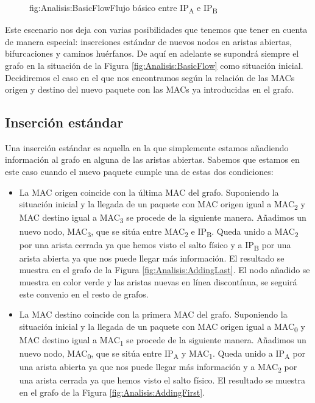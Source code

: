 \documentclass[tfg,epsbased,lof,lot,loa,covers,final,copyright,overleaf]{tfgtfmthesisuam}
\begin{document}
\begin{figure}[Flujo básico entre dos IPs]{fig:Analisis:BasicFlow}{Flujo básico entre IP\textsubscript{A} e IP\textsubscript{B}}
    
\end{figure}

Este escenario nos deja con varias posibilidades que tenemos que tener en cuenta de manera especial: inserciones estándar de nuevos nodos en aristas abiertas, bifurcaciones y caminos huérfanos. De aquí en adelante se supondrá siempre el grafo en la situación de la Figura \ref{fig:Analisis:BasicFlow} como situación inicial. Decidiremos el caso en el que nos encontramos según la relación de las MACs origen y destino del nuevo paquete con las MACs ya introducidas en el grafo.

\subsection{Inserción estándar}
Una inserción estándar es aquella en la que simplemente estamos añadiendo información al grafo en alguna de las aristas abiertas. Sabemos que estamos en este caso cuando el nuevo paquete cumple una de estas dos condiciones:
\begin{itemize}
    \item La MAC origen coincide con la última MAC del grafo. Suponiendo la situación inicial y la llegada de un paquete con MAC origen igual a MAC\textsubscript{2} y MAC destino igual a MAC\textsubscript{3} se procede de la siguiente manera. Añadimos un nuevo nodo, MAC\textsubscript{3}, que se sitúa entre MAC\textsubscript{2} e IP\textsubscript{B}. Queda unido a  MAC\textsubscript{2} por una arista cerrada ya que hemos visto el salto físico y a IP\textsubscript{B} por una arista abierta ya que nos puede llegar más información. El resultado se muestra en el grafo de la Figura \ref{fig:Analisis:AddingLast}. El nodo añadido se muestra en color verde y las aristas nuevas en línea discontínua, se seguirá este convenio en el resto de grafos.
    \item La MAC destino coincide con la primera MAC del grafo. Suponiendo la situación inicial y la llegada de un paquete con MAC origen igual a MAC\textsubscript{0} y MAC destino igual a MAC\textsubscript{1} se procede de la siguiente manera. Añadimos un nuevo nodo, MAC\textsubscript{0}, que se sitúa entre IP\textsubscript{A} y MAC\textsubscript{1}. Queda unido a IP\textsubscript{A} por una arista abierta ya que nos puede llegar más información y a  MAC\textsubscript{2} por una arista cerrada ya que hemos visto el salto físico. El resultado se muestra en el grafo de la Figura \ref{fig:Analisis:AddingFirst}.
\end{itemize}
\end{document}
